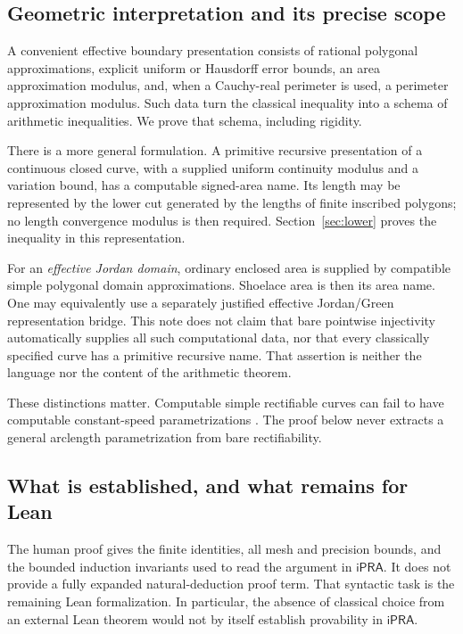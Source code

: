 \documentclass[11pt,a4paper]{article}
\theoremstyle{definition}
\newcommand{\ipra}{\mathsf{iPRA}}
\begin{document}
\subsection{Geometric interpretation and its precise scope}
A convenient effective boundary presentation consists of rational
polygonal approximations, explicit uniform or Hausdorff error bounds,
an area approximation modulus, and, when a Cauchy-real perimeter is used,
a perimeter approximation modulus. Such data turn the classical
inequality into a schema of arithmetic inequalities. We prove that
schema, including rigidity.

There is a more general formulation. A primitive recursive presentation
of a continuous closed curve, with a supplied uniform continuity modulus
and a variation bound, has a computable signed-area name. Its length may
be represented by the lower cut generated by the lengths of finite
inscribed polygons; no length convergence modulus is then required.
Section~\ref{sec:lower} proves the inequality in this representation.

For an \emph{effective Jordan domain}, ordinary enclosed area is supplied
by compatible simple polygonal domain approximations. Shoelace area is
then its area name. One may equivalently use a separately justified
effective Jordan/Green representation bridge. This note does not claim
that bare pointwise injectivity automatically supplies all such
computational data, nor that every classically specified curve has a
primitive recursive name. That assertion is neither the language nor
the content of the arithmetic theorem.

These distinctions matter. Computable simple rectifiable curves can
fail to have computable constant-speed parametrizations
\cite{gu-lutz-mayordomo}. The proof below never extracts a general
arclength parametrization from bare rectifiability.

\subsection{What is established, and what remains for Lean}
The human proof gives the finite identities, all mesh and precision
bounds, and the bounded induction invariants used to read the argument
in \(\ipra\). It does not provide a fully expanded natural-deduction
proof term. That syntactic task is the remaining Lean formalization.
In particular, the absence of classical choice from an external Lean
theorem would not by itself establish provability in \(\ipra\).
\end{document}
